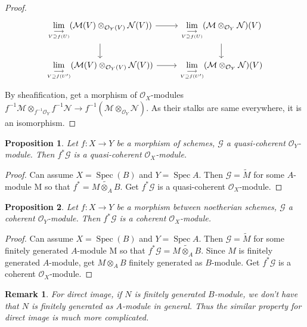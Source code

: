 \documentclass{ctexart}
\newtheorem{remark}{Remark}[section]
\newtheorem{proposition}{Proposition}[section]
\newcommand{\spec}{\operatorname{Spec}}
\begin{document}
\begin{proof}
\begin{equation*}
\begin{tikzcd}
            \underset{\underset{V \supseteq f(U)}{\longrightarrow}}{\lim} (\mathcal{M}(V) \otimes_{\mathcal{O}_{Y}(V)} \mathcal{N}(V)) \arrow[r] \arrow[d] & 
            \underset{\underset{V \supseteq f(U)}{\longrightarrow}}{\lim} (\mathcal{M} \otimes_{\mathcal{O}_{Y}} \mathcal{N})(V) \arrow[d] \\
            \underset{\underset{V \supseteq f(U')}{\longrightarrow}}{\lim} (\mathcal{M}(V) \otimes_{\mathcal{O}_{Y}(V)} \mathcal{N}(V)) \arrow[r] &
            \underset{\underset{V \supseteq f(U')}{\longrightarrow}}{\lim} (\mathcal{M} \otimes_{\mathcal{O}_{Y}} \mathcal{N})(V)
        \end{tikzcd}
    \end{equation*}
    By sheafification, get a morphism of $\mathcal{O}_{X}$-modules $f^{-1}\mathcal{M} \otimes_{f^{-1}\mathcal{O}_{Y}} f^{-1}\mathcal{N} \longrightarrow f^{-1}(\mathcal{M} \otimes_{\mathcal{O}_{Y}} \mathcal{N})$.
    As their stalks are same everywhere, it is an isomorphism.
\end{proof}
\begin{proposition}
    Let $f: X \longrightarrow Y$ be a morphism of schemes, $\mathcal{G}$ a quasi-coherent $\mathcal{O}_{Y}$-module.
    Then $f^{\ast}\mathcal{G}$ is a quasi-coherent $\mathcal{O}_{X}$-module.
    \label{Proposition 6.6}
\end{proposition}
\begin{proof}
    Can assume $X = \spec(B)$ and $Y = \spec A$.
    Then $\mathcal{G} = \widetilde{M}$ for some $A$-module M so that $f^{\ast} = \widetilde{M \otimes_{A} B}$.
    Get $f^{\ast}\mathcal{G}$ is a quasi-coherent $\mathcal{O}_{X}$-module.
\end{proof}
\begin{proposition}
    Let $f: X \longrightarrow Y$ be a morphism between noetherian schemes, $\mathcal{G}$ a coherent $\mathcal{O}_{Y}$-module.
    Then $f^{\ast}\mathcal{G}$ is a coherent $\mathcal{O}_{X}$-module.
    \label{Proposition 6.7}
\end{proposition}
\begin{proof}
    Can assume $X = \spec(B)$ and $Y = \spec A$.
    Then $\mathcal{G} = \widetilde{M}$ for some finitely generated $A$-module M so that $f^{\ast}\mathcal{G} = \widetilde{M \otimes_{A} B}$.
    Since $M$ is finitely generated $A$-module, get $M \otimes_{A} B$ finitely generated as $B$-module.
    Get $f^{\ast}\mathcal{G}$ is a coherent $\mathcal{O}_{X}$-module.
\end{proof}
\begin{remark}
    For direct image, if $N$ is finitely generated $B$-module, we don't have that $N$ is finitely generated as $A$-module in general.
    Thus the similar property for direct image is much more complicated.
\end{remark}
\end{document}
